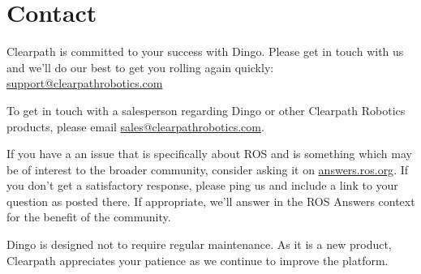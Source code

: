 \documentclass[]{clearpath-latex/clearpath-manual}
\begin{document}
\section{Contact}\label{trouble}\label{contact}

Clearpath is committed to your success with Dingo. Please get in touch with us and we'll
do our best to get you rolling again quickly: \href{mailto:support@clearpathrobotics.com}{support@clearpathrobotics.com}

To get in touch with a salesperson regarding Dingo or other Clearpath Robotics products, please
email \href{mailto:sales@clearpathrobotics.com}{sales@clearpathrobotics.com}.

If you have a an issue that is specifically about ROS and is something which may be of interest
to the broader community, consider asking it on \href{http://answers.ros.org}{answers.ros.org}.
If you don't get a satisfactory response, please ping us and include a link to your question
as posted there. If appropriate, we'll answer in the ROS Answers context for the benefit of the
community.

Dingo is designed not to require regular maintenance. As it is a new product, Clearpath
appreciates your patience as we continue to improve the platform.
\end{document}
